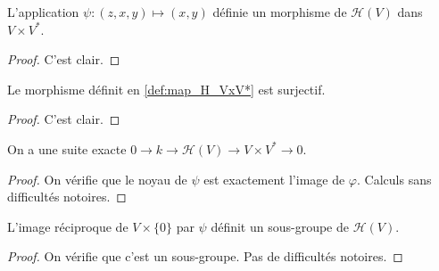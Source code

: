 \begin{definition}
    \label{def:map_H_VxV*}
    \leanok 

    L'application $\psi:(z,x,y)\mapsto (x,y)$ définie un morphisme de 
    $\mathcal{H}(V)$ dans $V\times V^*$.
    \begin{proof}
        \leanok
        C'est clair.
    \end{proof}
\end{definition}

\begin{proposition}
    \label{prop:surj_map_H_VxV*}
    \leanok 

    Le morphisme définit en \ref{def:map_H_VxV*} est surjectif.
    \begin{proof}
        \leanok
        C'est clair.
    \end{proof}
\end{proposition}

\begin{proposition}
    \label{exact_seq_h}
    \leanok 

    On a une suite exacte $0\rightarrow k \rightarrow \mathcal{H}(V) \rightarrow
    V\times V^* \rightarrow 0$.
    \begin{proof}
        \leanok
        On vérifie que le noyau de $\psi$ est exactement l'image de $\varphi$. Calculs sans difficultés notoires.
    \end{proof}
\end{proposition}

\begin{definition}[$\psi^{-1}(V)$]
    \label{def:psi_inv_V}
    \leanok 

    L'image réciproque de $V\times\{0\}$ par $\psi$ définit un sous-groupe de $\mathcal{H}(V)$.
    \begin{proof}
        \leanok
        On vérifie que c'est un sous-groupe. Pas de difficultés notoires.
    \end{proof}
\end{definition}


